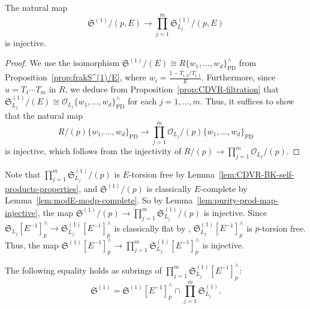 \begin{lem} \label{lem:purity-prod-map-injective}
The natural map
\[
\mathfrak{S}^{(1)}/(p,E) \rightarrow \prod_{j=1}^m \mathfrak{S}_{L_j}^{(1)}/(p,E)
\]
is injective.
\end{lem}

\begin{proof}
We use the isomorphism $\mathfrak{S}^{(1)}/(E) \cong R\{w_1,\ldots,w_d \}^\wedge_\mathrm{PD}$ from Proposition~\ref{prop:frakS^(1)/E}, 
where $\displaystyle w_i = \frac{1-T_{i, 2}/T_{i, 1}}{E}$. Furthermore, since $u = T_1\cdots T_m$ in $R$, we deduce from Proposition~\ref{prop:CDVR-filtration} that $\mathfrak{S}_{L_j}^{(1)}/(E) \cong \mathcal{O}_{L_j}\{w_1,\ldots,w_d \}^\wedge_\mathrm{PD}$ for each $j = 1, \ldots, m$. Thus, it suffices to show that the natural map
\[
R/(p)\{w_1,\ldots,w_d \}_\mathrm{PD} \rightarrow \prod_{j=1}^m \mathcal{O}_{L_j}/(p)\{w_1,\ldots,w_d \}_\mathrm{PD}
\]
is injective, which follows from the injectivity of $R/(p) \rightarrow \prod_{j=1}^m \mathcal{O}_{L_j}/(p)$.
\end{proof}

Note that $\prod_{j=1}^m  \mathfrak{S}_{L_j}^{(1)}/(p)$ is $E$-torsion free by Lemma~\ref{lem:CDVR-BK-self-products-properties}, and $\mathfrak{S}^{(1)}/(p)$ is classically $E$-complete by Lemma~\ref{lem:modE-modp-complete}. So by Lemma~\ref{lem:purity-prod-map-injective}, the map $\mathfrak{S}^{(1)}/(p) \rightarrow \prod_{j=1}^m \mathfrak{S}_{L_j}^{(1)}/(p)$ is injective. Since $\mathfrak{S}_{L_j}[E^{-1}]^{\wedge}_p \rightarrow \mathfrak{S}_{L_j}^{(1)}[E^{-1}]^{\wedge}_p$ is classically flat by \cite[Tag~0912]{stacks-project}, $\mathfrak{S}_{L_j}^{(1)}[E^{-1}]^{\wedge}_p$ is $p$-torsion free. Thus, the map $\mathfrak{S}^{(1)}[E^{-1}]^{\wedge}_p \rightarrow \prod_{j=1}^m \mathfrak{S}_{L_j}^{(1)}[E^{-1}]^{\wedge}_p$ is injective.

\begin{cor} \label{cor:purity-intersection}
The following equality holds as subrings of $\prod_{j=1}^m \mathfrak{S}_{L_j}^{(1)}[E^{-1}]^{\wedge}_p$:
\[ 
\mathfrak{S}^{(1)} = \mathfrak{S}^{(1)} [E^{-1}]^{\wedge}_p \cap \prod_{j=1}^m \mathfrak{S}_{L_j}^{(1)}.
\]
\end{cor}

